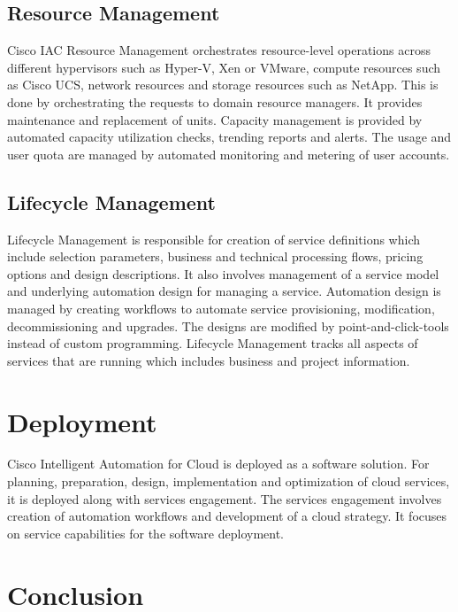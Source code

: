 \documentclass[9pt,twocolumn,twoside]{../../styles/osajnl}
\begin{document}
\subsection{Resource Management}

Cisco IAC Resource Management orchestrates resource-level operations
across different hypervisors such as Hyper-V, Xen or VMware, compute
resources such as Cisco UCS, network resources and storage resources
such as NetApp. This is done by orchestrating the requests to domain
resource managers. It provides maintenance and replacement of
units. Capacity management is provided by automated capacity
utilization checks, trending reports and alerts. The usage and user
quota are managed by automated monitoring and metering of user
accounts.

\subsection{Lifecycle Management}

Lifecycle Management is responsible for creation of service
definitions which include selection parameters, business and technical
processing flows, pricing options and design descriptions. It also
involves management of a service model and underlying automation
design for managing a service. Automation design is managed by
creating workflows to automate service provisioning, modification,
decommissioning and upgrades. The designs are modified by
point-and-click-tools instead of custom programming. Lifecycle
Management tracks all aspects of services that are running which
includes business and project information.

\section{Deployment}

Cisco Intelligent Automation for Cloud is deployed as a software
solution. For planning, preparation, design, implementation and
optimization of cloud services, it is deployed along with services
engagement. The services engagement involves creation of automation
workflows and development of a cloud strategy. It focuses on service
capabilities for the software deployment.

\section{Conclusion}
\end{document}
